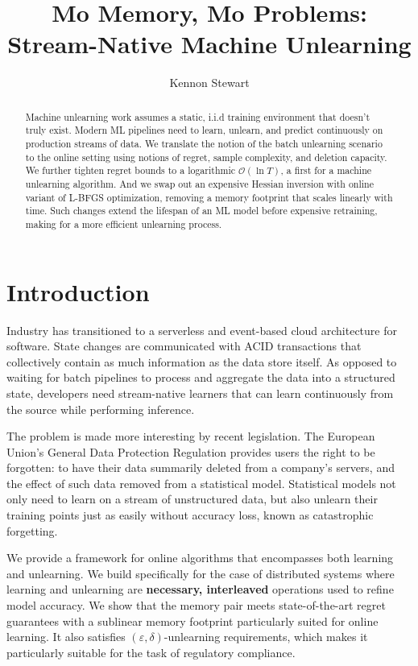 \documentclass[a4paper,12pt]{article}
\title{Mo Memory, Mo Problems: Stream-Native Machine Unlearning}
\author{Kennon Stewart}
\begin{document}
\maketitle

\begin{abstract}

Machine unlearning work assumes a static, i.i.d training environment that doesn't truly exist. Modern ML pipelines need to learn, unlearn, and predict continuously on production streams of data. We translate the notion of the batch unlearning scenario to the online setting using notions of regret, sample complexity, and deletion capacity. We further tighten regret bounds to a logarithmic $\mathcal{O}(\ln{T})$, a first for a machine unlearning algorithm. And we swap out an expensive Hessian inversion with online variant of L-BFGS optimization, removing a memory footprint that scales linearly with time. Such changes extend the lifespan of an ML model before expensive retraining, making for a more efficient unlearning process.

\end{abstract}


\section{Introduction}
\label{sec:intro}

Industry has transitioned to a serverless and event-based cloud architecture for software. State changes are communicated with ACID transactions that collectively contain as much information as the data store itself. As opposed to waiting for batch pipelines to process and aggregate the data into a structured state, developers need stream-native learners that can learn continuously from the source while performing inference.

The problem is made more interesting by recent legislation. The European Union's General Data Protection Regulation provides users the right to be forgotten: to have their data summarily deleted from a company's servers, and the effect of such data removed from a statistical model. Statistical models not only need to learn on a stream of unstructured data, but also unlearn their training points just as easily without accuracy loss, known as catastrophic forgetting.

We provide a framework for online algorithms that encompasses both learning and unlearning. We build specifically for the case of distributed systems where learning and unlearning are \textbf{necessary, interleaved} operations used to refine model accuracy. We show that the memory pair meets state-of-the-art regret guarantees with a sublinear memory footprint particularly suited for online learning. It also satisfies $(\varepsilon,\delta)$-unlearning requirements, which makes it particularly suitable for the task of regulatory compliance.
\end{document}
